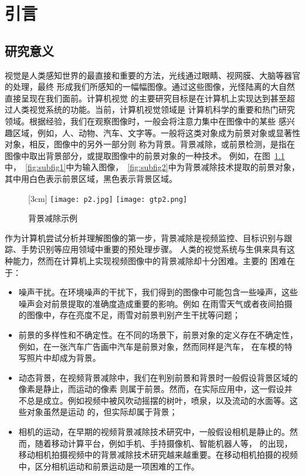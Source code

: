 \chapter{引言}
\label{cha:intro}

\section{研究意义}
\label{sec:first}
视觉是人类感知世界的最直接和重要的方法，光线通过眼睛、视网膜、大脑等器官的处理，最终
形成我们所感知的一幅幅图像。通过这些图像，光怪陆离的大自然直接呈现在我们面前。计算机视觉
的主要研究目标是在计算机上实现达到甚至超过人类视觉系统的功能。当前，计算机视觉领域是
计算机科学的重要和热门研究领域。根据经验，我们在观察图像时，一般会将注意力集中在图像中的某些
感兴趣区域，例如，人、动物、汽车、文字等。一般将这类对象成为前景对象或显著性对象，相反，图像中的另外一部分则
称为背景。背景减除，或前景检测，是指在图像中取出背景部分，或提取图像中的前景对象的一种技术。
例如，在图~\ref{fig:1}中，~\ref{fig:subfig1}中为输入图像，~\ref{fig:subfig2}中为背景减除技术提取的前景对象，其中用白色表示前景区域，黑色表示背景区域。\par
\begin{figure}[h]
  \centering%
  [3cm] %
    {\texttt{[image: p2.jpg]}}%
  \hspace{4em}%
      {\texttt{[image: gtp2.png]}}
  \caption{背景减除示例}
  \label{fig:1}
\end{figure}
作为计算机尝试分析并理解图像的第一步，背景减除是视频监控、目标识别与跟踪、手势识别等应用领域中重要的预处理步骤。
人类的视觉系统与生俱来具有这种能力，然而在计算机上实现视频图像中的背景减除却十分困难。主要的
困难在于：
 \begin{itemize}
    \item 噪声干扰。在环境噪声的干扰下，我们得到的图像中可能包含一些噪声，这些噪声会对前景提取的准确度造成重要的影响。例如
    在雨雪天气或者夜间拍摄的图像中，存在亮度不足，雨雪对前景判别产生干扰等问题；
    \item 前景的多样性和不确定性。在不同的场景下，前景对象的定义存在不确定性，例如，在一张汽车广告画中汽车是前景对象，然而同样是汽车，
    在车模的特写照片中却成为背景。
    \item 动态背景，在视频背景减除中，我们在判别前景和背景时一般假设背景区域的像素是静止，而运动的像素
    则属于前景。然而，在实际应用中，这一假设并不总是成立。例如视频中被风吹动摇摆的树叶，喷泉，以及流动的水面等。这些对象虽然是运动
    的，但实际却属于背景；
    \item 相机的运动，在早期的视频背景减除技术研究中，一般假设相机是静止的。然而，随着移动计算平台，例如手机、手持摄像机、智能机器人等，
    的出现，移动相机拍摄视频中的背景减除技术研究越来越重要。在移动相机拍摄的视频中，区分相机运动和前景运动是一项困难的工作。
  \end{itemize}

